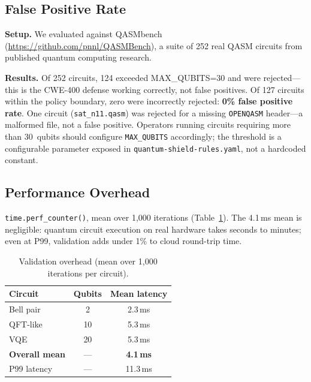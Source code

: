 \documentclass[conference,compsoc]{IEEEtran}
\begin{document}
\subsection{False Positive Rate}
\label{sec:fp}
\noindent \textbf{Setup.}
We evaluated against QASMbench~\cite{li2022qasmbench}
(\url{https://github.com/pnnl/QASMBench}), a suite of 252 real QASM
circuits from published quantum computing research.

\noindent \textbf{Results.}
Of 252 circuits, 124 exceeded MAX\_QUBITS=30 and were
rejected---this is the CWE-400 defense working correctly, not false
positives.
Of 127 circuits within the policy boundary, zero were incorrectly
rejected: \textbf{0\% false positive rate}.
One circuit (\texttt{sat\_n11.qasm}) was rejected for a missing
\texttt{OPENQASM} header---a malformed file, not a false positive.
Operators running circuits requiring more than 30~qubits should
configure \texttt{MAX\_QUBITS} accordingly; the threshold is a
configurable parameter exposed in \texttt{quantum-shield-rules.yaml},
not a hardcoded constant.

\subsection{Performance Overhead}
\noindent \texttt{time.perf\_counter()}, mean over 1,000 iterations
(Table~\ref{tab:perf}).
The 4.1\,ms mean is negligible: quantum circuit execution on real
hardware takes seconds to minutes; even at P99, validation adds
under 1\% to cloud round-trip time.

\begin{table}[!ht]
\centering
\caption{Validation overhead (mean over 1,000 iterations per circuit).}
\label{tab:perf}
\begin{tabular}{lcc}
\toprule
Circuit & Qubits & Mean latency \\
\midrule
Bell pair  &  2 & 2.3\,ms \\
QFT-like   & 10 & 5.3\,ms \\
VQE        & 20 & 5.3\,ms \\
\midrule
\textbf{Overall mean} & --- & \textbf{4.1\,ms} \\
P99 latency           & --- & 11.3\,ms \\
\bottomrule
\end{tabular}
\end{table}
\end{document}

